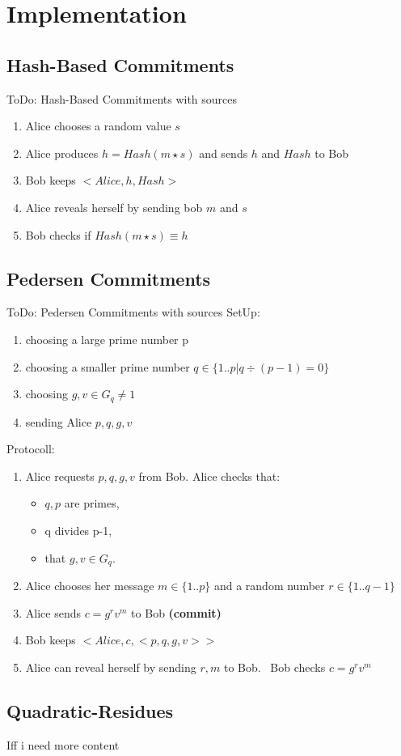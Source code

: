 
\section{Implementation}

\subsection{Hash-Based Commitments}
ToDo: Hash-Based Commitments with sources
	
	\begin{enumerate}
		\item Alice chooses a random value $s$
		\item Alice produces $h = Hash(m \star s)$ and sends $h$ and $Hash$ to Bob
		\item Bob keeps $<Alice,h,Hash>$
		\item Alice reveals herself by sending bob $m$ and $s$
		\item Bob checks if $Hash(m \star s) \equiv h$
	\end{enumerate}

\subsection{Pedersen Commitments}
ToDo: Pedersen Commitments with sources
SetUp:
	\begin{enumerate}
		\item choosing a large prime number p
		\item choosing a smaller prime number $q \in \{1..p| q\div (p-1) = 0\}$
		\item choosing $g,v \in G_q \neq 1$
		\item sending Alice $p,q,g,v$ 
	\end{enumerate}
Protocoll: 
	\begin{enumerate}
		\item Alice requests $p,q,g,v$ from Bob. \newline Alice checks that:
		\begin{itemize}
			\item $q,p$ are primes, 
			\item q divides p-1, 
			\item that $g,v \in G_q$. 
		\end{itemize}
		\item Alice chooses her message $m \in \{1..p\}$ and a random number $r \in \{1..q-1\}$
		\item Alice sends $c = g^rv^m$ to Bob \textbf{(commit)}
		\item Bob keeps $<Alice,c,<p,q,g,v>>$
		\item Alice can reveal herself by sending $r,m$ to Bob. ~\newline Bob checks $c = g^rv^m$
	\end{enumerate}

\subsection{Quadratic-Residues}
Iff i need more content